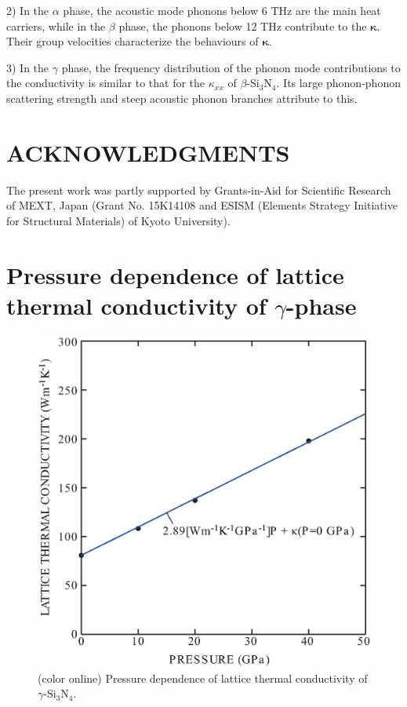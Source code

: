 \documentclass[twocolumn,amsmath,amssymb,a4paper,prb,superscriptaddress,floatfix]{revtex4-1}
\begin{document}
2) In the $\alpha$ phase, the acoustic mode phonons below 6 THz are the main
heat carriers, while in the $\beta$ phase, the phonons below 12 THz contribute
to the $\boldsymbol{\kappa}$. Their group velocities characterize the
behaviours of $\boldsymbol{\kappa}$.

3) In the $\gamma$ phase, the frequency distribution of the phonon mode
contributions to the conductivity is similar to that for the $\kappa_{xx}$ of
$\beta$-Si$_3$N$_4$. Its large phonon-phonon scattering strength and steep
acoustic phonon branches attribute to this.



\section*{ACKNOWLEDGMENTS}
The present work was partly supported by Grants-in-Aid for Scientific
Research of MEXT, Japan (Grant No. 15K14108 and ESISM (Elements Strategy
Initiative for Structural Materials) of Kyoto University).

\appendix
\section{Pressure dependence of lattice thermal conductivity of $\gamma$-phase}
\begin{figure}[ht]
 \begin{center}
  \includegraphics[width=0.80\linewidth]{S1.eps} \caption{(color online)
  Pressure dependence of lattice thermal conductivity of $\gamma$-Si$_3$N$_4$.  \label{fig:S1} }
 \end{center}
\end{figure}

\end{document}
